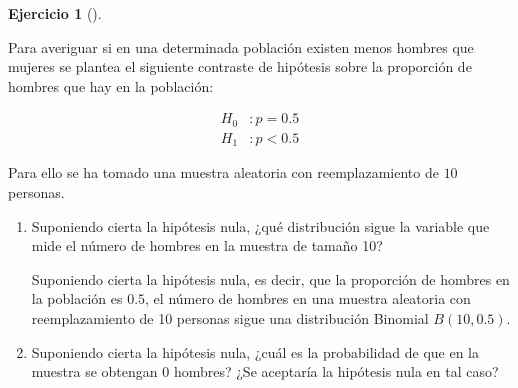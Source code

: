 \documentclass[
  a4paper,
]{scrreport}
\theoremstyle{definition}
\newtheorem{exercise}{Ejercicio}[chapter]
\theoremstyle{remark}
\begin{document}
\begin{exercise}[]\protect\hypertarget{exr-contraste-hipotesis-proporcion-hombres}{}\label{exr-contraste-hipotesis-proporcion-hombres}

Para averiguar si en una determinada población existen menos hombres que
mujeres se plantea el siguiente contraste de hipótesis sobre la
proporción de hombres que hay en la población:

\begin{align*}
H_0 &: p=0.5\\
H_1 &: p<0.5 
\end{align*}

Para ello se ha tomado una muestra aleatoria con reemplazamiento de
\(10\) personas.

\begin{enumerate}
\def\labelenumi{\alph{enumi}.}
\item
  Suponiendo cierta la hipótesis nula, ¿qué distribución sigue la
  variable que mide el número de hombres en la muestra de tamaño 10?

  \begin{tcolorbox}[enhanced jigsaw, colframe=quarto-callout-tip-color-frame, toprule=.15mm, bottomtitle=1mm, breakable, opacitybacktitle=0.6, toptitle=1mm, colback=white, bottomrule=.15mm, title=\textcolor{quarto-callout-tip-color}{\faLightbulb}\hspace{0.5em}{Solución}, arc=.35mm, left=2mm, titlerule=0mm, rightrule=.15mm, coltitle=black, leftrule=.75mm, opacityback=0, colbacktitle=quarto-callout-tip-color!10!white]

  Suponiendo cierta la hipótesis nula, es decir, que la proporción de
  hombres en la población es \(0.5\), el número de hombres en una
  muestra aleatoria con reemplazamiento de 10 personas sigue una
  distribución Binomial \(B(10, 0.5)\).

  \end{tcolorbox}
\item
  Suponiendo cierta la hipótesis nula, ¿cuál es la probabilidad de que
  en la muestra se obtengan 0 hombres? ¿Se aceptaría la hipótesis nula
  en tal caso?

  \begin{tcolorbox}[enhanced jigsaw, colframe=quarto-callout-tip-color-frame, toprule=.15mm, bottomtitle=1mm, breakable, opacitybacktitle=0.6, toptitle=1mm, colback=white, bottomrule=.15mm, title=\textcolor{quarto-callout-tip-color}{\faLightbulb}\hspace{0.5em}{Solución}, arc=.35mm, left=2mm, titlerule=0mm, rightrule=.15mm, coltitle=black, leftrule=.75mm, opacityback=0, colbacktitle=quarto-callout-tip-color!10!white]


\end{tcolorbox}
\end{enumerate}
\end{exercise}
\end{document}
